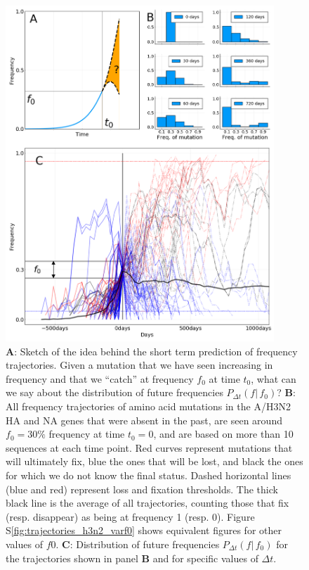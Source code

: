 \documentclass[reprint,amsmath,amssymb,superscriptaddress,showpacs,rmp]{revtex4-1}
\newcommand{\sref}[1]{S\ref{#1}}
\begin{document}
\begin{figure}
	\centering
	\includegraphics[width=0.9\textwidth]{./Figures/Panel1.png}
	\caption{\textbf{A}: Sketch of the idea behind the short term prediction of frequency trajectories. Given a mutation that we have seen increasing in frequency and that we ``catch'' at frequency $f_0$ at time $t_0$, what can we say about the distribution of future frequencies $P_{\Delta t}(f\vert\,f_0)$? \textbf{B}: All frequency trajectories of amino acid mutations in the A/H3N2 HA and NA genes that were absent in the past, are seen around $f_0=30\%$ frequency at time $t_0=0$, and are based on more than 10 sequences at each time point. Red curves represent mutations that will ultimately fix, blue the ones that will be lost, and black the ones for which we do not know the final status. Dashed horizontal lines (blue and red) represent loss and fixation thresholds. The thick black line is the average of all trajectories, counting those that fix (resp. disappear) as being at frequency 1 (resp. 0). Figure \sref{fig:trajectories_h3n2_varf0} shows equivalent figures for other values of $f0$. \textbf{C}: Distribution of future frequencies $P_{\Delta t}(f\vert\,f_0)$ for the trajectories shown in panel \textbf{B} and for specific values of $\Delta t$. }
	\label{fig:trajectories}
\end{figure}
\end{document}

